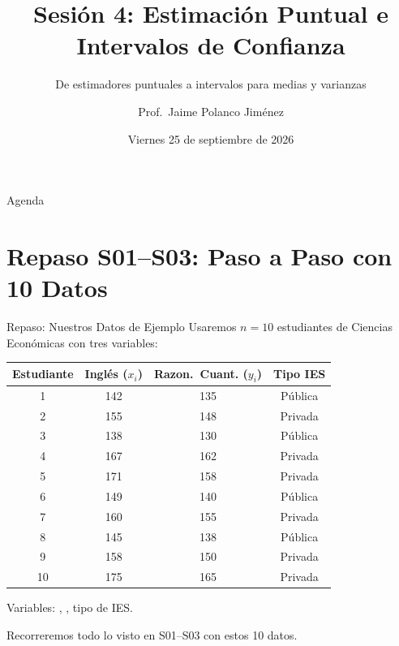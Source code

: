 \documentclass[aspectratio=169, 11pt]{beamer}
\title{Sesión 4: Estimación Puntual e Intervalos de Confianza}
\subtitle{De estimadores puntuales a intervalos para medias y varianzas}
\author{Prof.\ Jaime Polanco Jim\'enez}
\date{Viernes 25 de septiembre de 2026}
\begin{document}
\begin{frame}
\titlepage
\end{frame}

\begin{frame}{Agenda}
\tableofcontents
\end{frame}

\section{Repaso S01--S03: Paso a Paso con 10 Datos}

\begin{frame}{Repaso: Nuestros Datos de Ejemplo}
Usaremos $n = 10$ estudiantes de Ciencias Econ\'omicas con tres variables:

\vspace{0.3cm}
\begin{table}
\centering
\small
\begin{tabular}{cccc}
\toprule
\textbf{Estudiante} & \textbf{Ingl\'es} ($x_i$) & \textbf{Razon.\ Cuant.} ($y_i$) & \textbf{Tipo IES} \\
\midrule
1  & 142 & 135 & P\'ublica \\
2  & 155 & 148 & Privada \\
3  & 138 & 130 & P\'ublica \\
4  & 167 & 162 & Privada \\
5  & 171 & 158 & Privada \\
6  & 149 & 140 & P\'ublica \\
7  & 160 & 155 & Privada \\
8  & 145 & 138 & P\'ublica \\
9  & 158 & 150 & Privada \\
10 & 175 & 165 & Privada \\
\bottomrule
\end{tabular}
\end{table}

\vspace{0.2cm}
\small
Variables: , , tipo de IES.

Recorreremos \alert{todo} lo visto en S01--S03 con estos 10 datos.
\end{frame}

\end{document}
